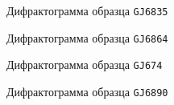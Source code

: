 \begin{figure}[ht]
{\centering
  \tiny
  \centering
  
  }
\caption{Дифрактограмма образца \texttt{GJ6835}}
\label{img:difract6835}
\end{figure}


\begin{figure}[ht]
{\centering
  \tiny
  \centering
  
  }
\caption{Дифрактограмма образца \texttt{GJ6864}}
\label{img:difract6864}
\end{figure}

\begin{figure}[ht]
  {\centering
    \tiny
    \centering
    
    }
\caption{Дифрактограмма образца \texttt{GJ674}}
\label{img:difract6874}
\end{figure}

\begin{figure}[ht]
{\centering
  \tiny
  \centering
  
  }
\caption{Дифрактограмма образца \texttt{GJ6890}}
\label{img:difract6890}
\end{figure}